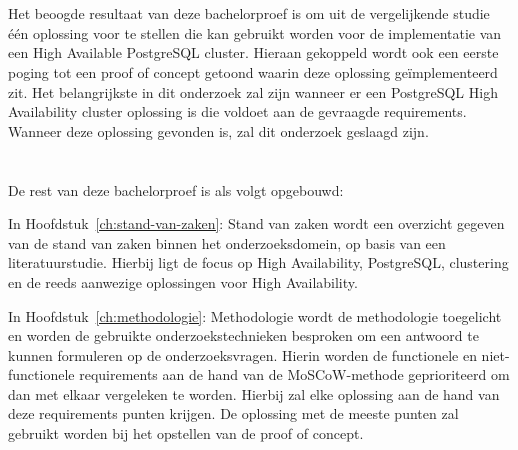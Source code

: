 \section{}
\label{sec:onderzoeksdoelstelling}

Het beoogde resultaat van deze bachelorproef is om uit de vergelijkende studie één oplossing voor te stellen die kan gebruikt worden voor de implementatie van een High Available PostgreSQL cluster. Hieraan gekoppeld wordt ook een eerste poging tot een proof of concept getoond waarin deze oplossing geïmplementeerd zit. Het belangrijkste in dit onderzoek zal zijn wanneer er een PostgreSQL High Availability cluster oplossing is die voldoet aan de gevraagde requirements. Wanneer deze oplossing gevonden is, zal dit onderzoek geslaagd zijn.


\section{}
\label{sec:opzet-bachelorproef}


De rest van deze bachelorproef is als volgt opgebouwd:

In Hoofdstuk~\ref{ch:stand-van-zaken}: Stand van zaken wordt een overzicht gegeven van de stand van zaken binnen het onderzoeksdomein, op basis van een literatuurstudie. Hierbij ligt de focus op High Availability, PostgreSQL, clustering en de reeds aanwezige oplossingen voor High Availability.

In Hoofdstuk~\ref{ch:methodologie}: Methodologie wordt de methodologie toegelicht en worden de gebruikte onderzoekstechnieken besproken om een antwoord te kunnen formuleren op de onderzoeksvragen. Hierin worden de functionele en niet-functionele requirements aan de hand van de MoSCoW-methode geprioriteerd om dan met elkaar vergeleken te worden. Hierbij zal elke oplossing aan de hand van deze requirements punten krijgen. De oplossing met de meeste punten zal gebruikt worden bij het opstellen van de proof of concept.


